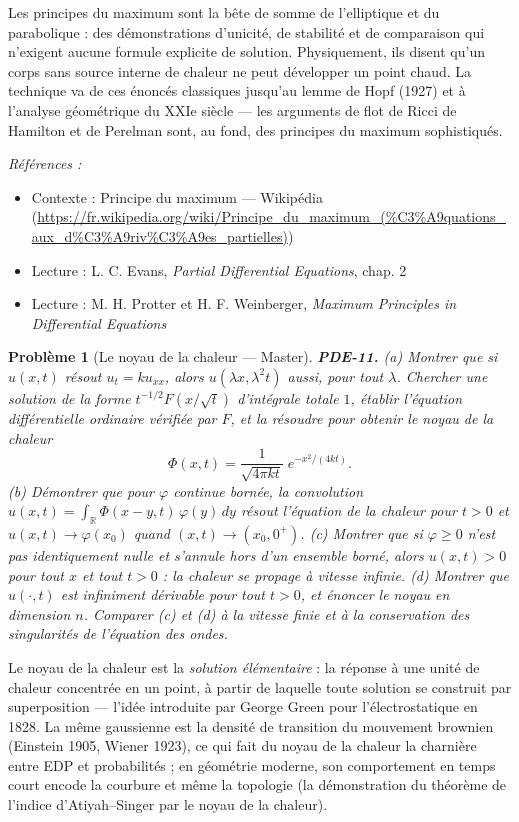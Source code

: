 \documentclass[11pt]{article}
\newtheorem{problem}{Problème}
\newenvironment{refs}{\par\small\noindent\emph{Références :}\begin{itemize}\setlength\itemsep{0pt}}{\end{itemize}\normalsize}
\begin{document}
\noindent Les principes du maximum sont la bête de somme de l'elliptique et du
parabolique : des démonstrations d'unicité, de stabilité et de comparaison qui n'exigent aucune
formule explicite de solution. Physiquement, ils disent qu'un corps sans source interne de chaleur
ne peut développer un point chaud. La technique va de ces énoncés classiques jusqu'au lemme de
Hopf (1927) et à l'analyse géométrique du XXIe siècle --- les arguments de flot de Ricci
de Hamilton et de Perelman sont, au fond, des principes du maximum sophistiqués.

\begin{refs}
\item Contexte : Principe du maximum --- Wikipédia (\url{https://fr.wikipedia.org/wiki/Principe_du_maximum_(%C3%A9quations_aux_d%C3%A9riv%C3%A9es_partielles)})
\item Lecture : L. C. Evans, \textit{Partial Differential Equations}, chap. 2
\item Lecture : M. H. Protter et H. F. Weinberger, \textit{Maximum Principles in Differential Equations}
\end{refs}

\bigskip

\begin{problem}[{Le noyau de la chaleur --- Master}]
\textbf{PDE-11.} (a) Montrer que si $u(x,t)$ résout
$u_t = k u_{xx}$, alors $u(\lambda x, \lambda^2 t)$ aussi, pour tout $\lambda$.
Chercher une solution de la forme $t^{-1/2}F(x/\sqrt{t})$ d'intégrale totale $1$,
établir l'équation différentielle ordinaire vérifiée par $F$, et la résoudre pour obtenir le
noyau de la chaleur
\[ \Phi(x,t) = \frac{1}{\sqrt{4\pi k t}}\; e^{-x^2/(4kt)}. \]
(b) Démontrer que pour $\varphi$ continue bornée, la convolution
$u(x,t) = \int_{\mathbb{R}} \Phi(x-y,t)\,\varphi(y)\,dy$ résout l'équation de la chaleur
pour $t > 0$ et $u(x,t) \to \varphi(x_0)$ quand $(x,t) \to (x_0, 0^+)$.
(c) Montrer que si $\varphi \ge 0$ n'est pas identiquement nulle et s'annule hors d'un
ensemble borné, alors $u(x,t) > 0$ pour tout $x$ et tout $t > 0$ : la chaleur
se propage à vitesse infinie. (d) Montrer que $u(\cdot,t)$ est infiniment dérivable
pour tout $t > 0$, et énoncer le noyau en dimension $n$. Comparer (c) et (d)
à la vitesse finie et à la conservation des singularités de l'équation des ondes.
\end{problem}

\noindent Le noyau de la chaleur est la \textit{solution élémentaire} : la réponse
à une unité de chaleur concentrée en un point, à partir de laquelle toute solution se construit
par superposition --- l'idée introduite par George Green pour l'électrostatique en 1828. La
même gaussienne est la densité de transition du mouvement brownien (Einstein 1905, Wiener
1923), ce qui fait du noyau de la chaleur la charnière entre EDP et probabilités ; en géométrie
moderne, son comportement en temps court encode la courbure et même la topologie (la
démonstration du théorème de l'indice d'Atiyah--Singer par le noyau de la chaleur).
\end{document}

